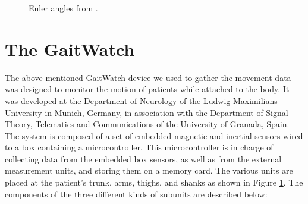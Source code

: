 \begin{figure}
\begin{subfigure}[]{0.45\textwidth}
\end{subfigure}


\caption{Euler angles from \cite{olivares_vicente_gaitwatch_2013}.}
	\label{fig:GaitWatch_placement}
\end{figure}




\section{The GaitWatch}

The above mentioned GaitWatch device we used to gather the movement data was designed to monitor the motion of patients while attached to the body. It was developed at the Department of Neurology of the Ludwig-Maximilians University in Munich, Germany, in association with the Department of Signal Theory, Telematics and Communications of the University of Granada, Spain. The system is composed of a set of embedded magnetic and inertial sensors wired to a box containing a microcontroller. This microcontroller is in charge of collecting data from the embedded box sensors, as well as from the external measurement units, and storing them on a memory card. The various units are placed at the patient's trunk, arms, thighs, and shanks as shown in Figure \ref{fig:GaitWatch_placement}. The components of the three different kinds of subunits are described below:


